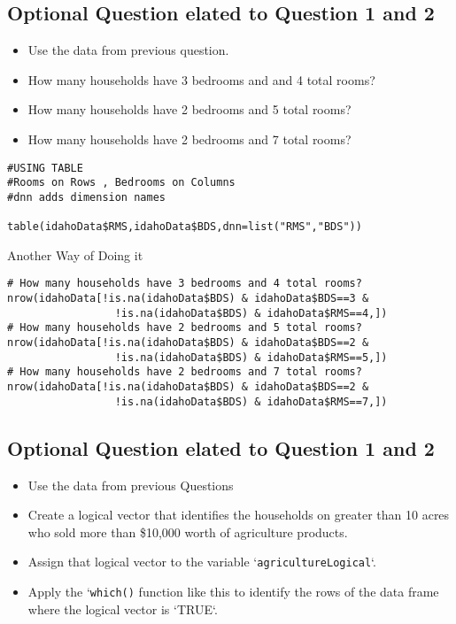 \documentclass[]{article}
\begin{document}
\begin{framed}
\newpage
\subsection*{Optional Question elated to Question 1 and 2}

\begin{itemize}
\item Use the data from previous question. 
\item How many households have 3 bedrooms and and 4 total rooms? 
\item How many households have 2 bedrooms and 5 total rooms? 
\item How many households have 2 bedrooms and 7 total rooms?
\end{itemize}
\begin{framed}
\begin{verbatim}
#USING TABLE
#Rooms on Rows , Bedrooms on Columns
#dnn adds dimension names

table(idahoData$RMS,idahoData$BDS,dnn=list("RMS","BDS"))

\end{verbatim}
\end{framed}
Another Way of Doing it
\begin{framed}
\begin{verbatim}
# How many households have 3 bedrooms and 4 total rooms?
nrow(idahoData[!is.na(idahoData$BDS) & idahoData$BDS==3 &
                 !is.na(idahoData$BDS) & idahoData$RMS==4,])
# How many households have 2 bedrooms and 5 total rooms?
nrow(idahoData[!is.na(idahoData$BDS) & idahoData$BDS==2 &
                 !is.na(idahoData$BDS) & idahoData$RMS==5,])
# How many households have 2 bedrooms and 7 total rooms?
nrow(idahoData[!is.na(idahoData$BDS) & idahoData$BDS==2 &
                 !is.na(idahoData$BDS) & idahoData$RMS==7,])

\end{verbatim}
\end{framed}


\newpage
\subsection*{Optional Question elated to Question 1 and 2}
\begin{itemize}
\item Use the data from previous Questions 
\item Create a logical vector that identifies the households on greater than 10 acres who sold more than \$10,000 worth of agriculture products. 
\item Assign that logical vector to the variable `\texttt{agricultureLogical}`. 
\item Apply the `\texttt{which()} function like this to identify the rows of the data frame where the logical vector is `TRUE`.
\end{itemize}


\end{framed}
\end{document}
